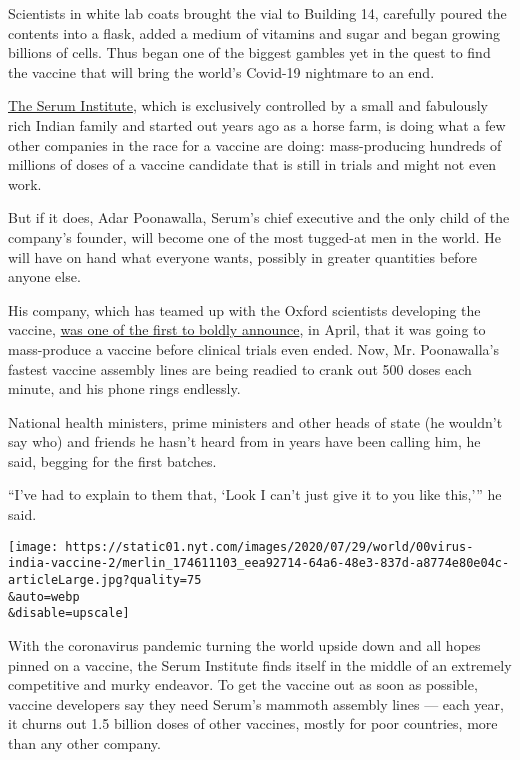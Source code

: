 Scientists in white lab coats brought the vial to Building 14, carefully
poured the contents into a flask, added a medium of vitamins and sugar
and began growing billions of cells. Thus began one of the biggest
gambles yet in the quest to find the vaccine that will bring the world's
Covid-19 nightmare to an end.

\href{https://www.seruminstitute.com/index.php}{The Serum Institute},
which is exclusively controlled by a small and fabulously rich Indian
family and started out years ago as a horse farm, is doing what a few
other companies in the race for a vaccine are doing: mass-producing
hundreds of millions of doses of a vaccine candidate that is still in
trials and might not even work.

But if it does, Adar Poonawalla, Serum's chief executive and the only
child of the company's founder, will become one of the most tugged-at
men in the world. He will have on hand what everyone wants, possibly in
greater quantities before anyone else.

His company, which has teamed up with the Oxford scientists developing
the vaccine,
\href{https://www.news18.com/news/business/indias-serum-institute-to-make-millions-of-potential-coronavirus-vaccine-doses-2597041.html}{was
one of the first to boldly announce}, in April, that it was going to
mass-produce a vaccine before clinical trials even ended. Now, Mr.
Poonawalla's fastest vaccine assembly lines are being readied to crank
out 500 doses each minute, and his phone rings endlessly.

National health ministers, prime ministers and other heads of state (he
wouldn't say who) and friends he hasn't heard from in years have been
calling him, he said, begging for the first batches.

``I've had to explain to them that, `Look I can't just give it to you
like this,''' he said.

\texttt{[image: https://static01.nyt.com/images/2020/07/29/world/00virus-india-vaccine-2/merlin\_174611103\_eea92714-64a6-48e3-837d-a8774e80e04c-articleLarge.jpg?quality=75\\\&auto=webp\\\&disable=upscale]}

With the coronavirus pandemic turning the world upside down and all
hopes pinned on a vaccine, the Serum Institute finds itself in the
middle of an extremely competitive and murky endeavor. To get the
vaccine out as soon as possible, vaccine developers say they need
Serum's mammoth assembly lines --- each year, it churns out 1.5 billion
doses of other vaccines, mostly for poor countries, more than any other
company.

